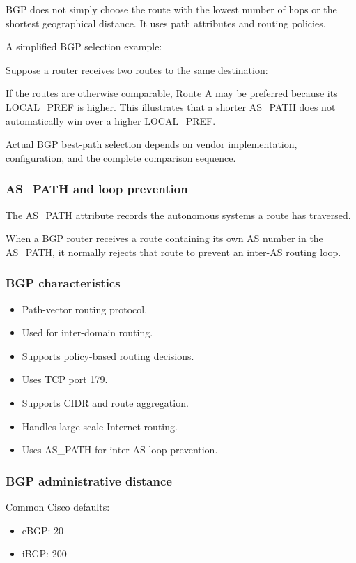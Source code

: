 BGP does not simply choose the route with the lowest number of hops or the shortest geographical distance. It uses path attributes and routing policies.


A simplified BGP selection example:

Suppose a router receives two routes to the same destination:


If the routes are otherwise comparable, Route A may be preferred because its LOCAL\_PREF is higher. This illustrates that a shorter AS\_PATH does not automatically win over a higher LOCAL\_PREF.

Actual BGP best-path selection depends on vendor implementation, configuration, and the complete comparison sequence.

\subsubsection{AS\_PATH and loop prevention}

The AS\_PATH attribute records the autonomous systems a route has traversed.

When a BGP router receives a route containing its own AS number in the AS\_PATH, it normally rejects that route to prevent an inter-AS routing loop.

\subsubsection{BGP characteristics}

\begin{itemize}
\item Path-vector routing protocol.
\item Used for inter-domain routing.
\item Supports policy-based routing decisions.
\item Uses TCP port 179.
\item Supports CIDR and route aggregation.
\item Handles large-scale Internet routing.
\item Uses AS\_PATH for inter-AS loop prevention.
\end{itemize}

\subsubsection{BGP administrative distance}

Common Cisco defaults:

\begin{itemize}
\item eBGP: 20
\item iBGP: 200
\end{itemize}

